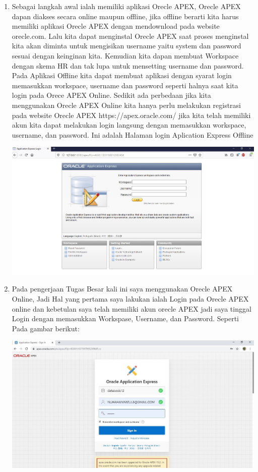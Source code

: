 \documentclass[a4paper,12pt]{report}
\begin{document}
\begin{enumerate}
    \item Sebagai langkah awal ialah memiliki aplikasi Orecle APEX, Orecle APEX dapan diakses secara online maupun offline, jika offline berarti kita harus memiliki aplikasi Orecle APEX dengan mendownload pada website orecle.com. Lalu kita dapat menginstal Orecle APEX saat proses menginstal kita akan diminta untuk mengisikan username yaitu system dan password sesuai dengan keinginan kita. Kemudian kita dapan membuat Workspace dengan skema HR dan tak lupa untuk mensetting username dan password. Pada Aplikasi Offline kita dapat membuat aplikasi dengan syarat login memasukkan workspace, username dan password seperti halnya saat kita login pada Orece APEX Online. Sedikit ada perbedaan jika kita menggunakan Orecle APEX Online kita hanya perlu melakukan registrasi pada website Orecle APEX https://apex.oracle.com/ jika kita telah memiliki akun kita dapat melakukan login langsung dengan memasukkan workspace, username, dan password. Ini adalah Halaman login Aplication Express Offline
    \begin{center}
    \includegraphics[width=11cm\textwidth]{figure/loginoff.jpg}
    \end{center}
    \item Pada pengerjaan Tugas Besar kali ini saya menggunakan Orecle APEX Online, Jadi Hal yang pertama saya lakukan ialah Login pada Orecle APEX online dan kebetulan saya telah memiliki akun orecle APEX jadi saya tinggal Login dengan memasukkan Workspase, Username, dan Password. Seperti Pada gambar berikut:
    \begin{center}
    \includegraphics[width=11cm\textwidth]{figure/login.jpg}

\end{center}
\end{enumerate}
\end{document}

